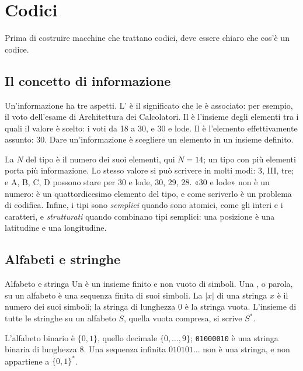\section{Codici}

Prima di costruire macchine che trattano codici, deve essere chiaro che cos'è
un codice.

\subsection{Il concetto di informazione}

Un'informazione ha tre aspetti. L' è il significato che le è
associato: per esempio, il voto dell'esame di Architettura dei Calcolatori. Il
 è l'insieme degli elementi tra i quali il valore è scelto: i voti
da 18 a 30, e 30 e lode. Il  è l'elemento effettivamente assunto:
30. Dare un'informazione è scegliere un elemento in un insieme definito.

La  $N$ del tipo è il numero dei suoi elementi, qui $N=14$;
un tipo con più elementi porta più informazione. Lo stesso valore si può
scrivere in molti modi: 3, III, tre; e A, B, C, D possono stare per 30 e lode,
30, 29, 28. «30 e lode» non è un numero: è un quattordicesimo elemento del
tipo, e come scriverlo è un problema di codifica. Infine, i tipi sono
\emph{semplici} quando sono atomici, come gli interi e i caratteri, e
\emph{strutturati} quando combinano tipi semplici: una posizione è una
latitudine e una longitudine.

\subsection{Alfabeti e stringhe}

\begin{definition}{Alfabeto e stringa}
Un  è un insieme finito e non vuoto di simboli. Una
, o parola, su un alfabeto è una sequenza finita di suoi simboli.
La  $|x|$ di una stringa $x$ è il numero dei suoi simboli; la
stringa di lunghezza 0 è la stringa vuota. L'insieme di tutte le stringhe su un
alfabeto $S$, quella vuota compresa, si scrive $S^{*}$.
\end{definition}

L'alfabeto binario è $\{0,1\}$, quello decimale $\{0,\dots,9\}$;
\texttt{01000010} è una stringa binaria di lunghezza 8. Una sequenza infinita
$010101\ldots$ non è una stringa, e non appartiene a $\{0,1\}^{*}$.

